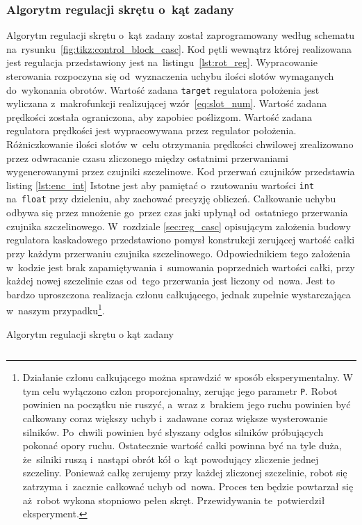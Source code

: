 \documentclass[11pt]{article}
\begin{document}
\subsubsection{Algorytm regulacji skrętu o~kąt zadany}
Algorytm regulacji skrętu o~kąt zadany został zaprogramowany według schematu na~rysunku~\ref{fig:tikz:control_block_casc}.
Kod pętli wewnątrz której realizowana jest regulacja przedstawiony jest na~listingu~\ref{lst:rot_reg}.
Wypracowanie sterowania rozpoczyna się od~wyznaczenia uchybu ilości slotów wymaganych do~wykonania obrotów.
Wartość zadana \texttt{target} regulatora położenia jest wyliczana z~makrofunkcji realizującej wzór~\ref{eq:slot_num}.
Wartość zadana prędkości została ograniczona, aby zapobiec poślizgom.
Wartość zadana regulatora prędkości jest wypracowywana przez regulator położenia.
Różniczkowanie ilości slotów w~celu otrzymania prędkości chwilowej zrealizowano przez odwracanie czasu zliczonego między ostatnimi przerwaniami wygenerowanymi przez czujniki szczelinowe.
Kod przerwań czujników przedstawia listing \ref{lst:enc_int}
Istotne jest aby pamiętać o~rzutowaniu wartości \texttt{int} na~\texttt{float} przy dzieleniu, aby zachować precyzję obliczeń.
Całkowanie uchybu odbywa się przez mnożenie go~przez czas jaki upłynął od~ostatniego przerwania czujnika szczelinowego.
W~rozdziale \ref{sec:reg_casc} opisującym założenia budowy regulatora kaskadowego przedstawiono pomysł konstrukcji zerującej wartość całki przy każdym przerwaniu czujnika szczelinowego.
Odpowiednikiem tego założenia w~kodzie jest brak zapamiętywania i~sumowania poprzednich wartości całki, przy każdej nowej szczelinie czas od~tego przerwania jest liczony od~nowa.
Jest to bardzo uproszczona realizacja członu całkującego, jednak zupełnie wystarczająca w~naszym przypadku\footnote{
	Działanie członu całkującego można sprawdzić w sposób eksperymentalny.
	W tym celu wyłączono człon proporcjonalny, zerując jego parametr \texttt{P}.
	Robot powinien na początku nie ruszyć, a~wraz z~brakiem jego ruchu powinien być całkowany coraz większy uchyb i~zadawane coraz większe wysterowanie silników.
	Po~chwili powinien być słyszany odgłos silników próbujących pokonać opory ruchu.
	Ostatecznie wartość całki powinna być na tyle duża, że~silniki ruszą i~nastąpi obrót kół o~kąt powodujący zliczenie jednej szczeliny.
	Ponieważ całkę zerujemy przy każdej zliczonej szczelinie, robot się zatrzyma i~zacznie całkować uchyb od~nowa.
	Proces ten będzie powtarzał się aż~robot wykona stopniowo pełen skręt.
	Przewidywania te~potwierdził eksperyment.
}.

\begin{listing}[htb]
\caption{Algorytm regulacji skrętu o kąt zadany}
\inputminted[firstline=85, lastline=126, frame=lines, linenos, breaklines, fontsize=\small ]{cpp}{../src/platformMotors.cpp}
\label{lst:rot_reg}
\end{listing}
\end{document}
